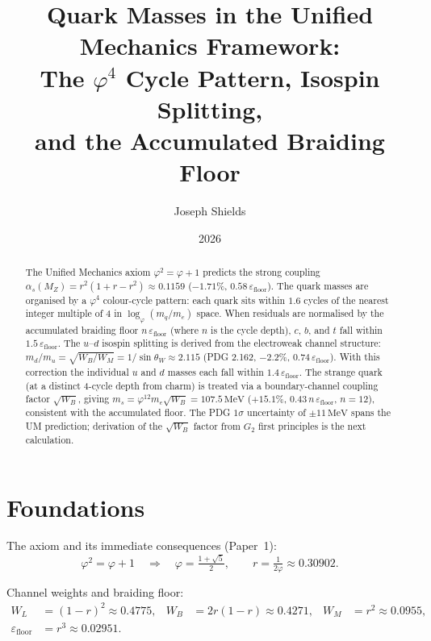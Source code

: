\documentclass[12pt]{article}
\title{\textbf{Quark Masses in the Unified Mechanics Framework:\\
The $\varphi^4$ Cycle Pattern, Isospin Splitting,\\
and the Accumulated Braiding Floor}}
\author{Joseph Shields}
\date{2026}
\begin{document}
\maketitle

\begin{abstract}
The Unified Mechanics axiom $\varphi^2 = \varphi + 1$ predicts the strong coupling
$\alpha_s(M_Z) = r^2(1+r-r^2) \approx 0.1159$ ($-1.71\%$,
$0.58\,\varepsilon_{\text{floor}}$). The quark masses are organised by
a $\varphi^4$ colour-cycle pattern: each quark sits within $1.6$ cycles of
the nearest integer multiple of 4 in $\log_\varphi(m_q/m_e)$ space.
When residuals are normalised by the accumulated braiding floor
$n\,\varepsilon_{\text{floor}}$ (where $n$ is the cycle depth), $c$, $b$, and
$t$ fall within $1.5\,\varepsilon_{\text{floor}}$. The $u$--$d$ isospin
splitting is derived from the electroweak channel structure:
$m_d/m_u = \sqrt{W_B/W_M} = 1/\!\sin\theta_W \approx 2.115$ (PDG 2.162,
$-2.2\%$, $0.74\,\varepsilon_{\text{floor}}$). With this correction the
individual $u$ and $d$ masses each fall within $1.4\,\varepsilon_{\text{floor}}$.
The strange quark (at a distinct 4-cycle depth from charm) is treated via a
boundary-channel coupling factor $\sqrt{W_B}$, giving $m_s = \varphi^{12}m_e\sqrt{W_B}
= 107.5\,\text{MeV}$ ($+15.1\%$, $0.43\,n\,\varepsilon_{\text{floor}}$, $n = 12$),
consistent with the accumulated floor. The PDG $1\sigma$ uncertainty of
$\pm 11\,\text{MeV}$ spans the UM prediction; derivation of the $\sqrt{W_B}$
factor from $G_2$ first principles is the next calculation.
\end{abstract}

\section{Foundations}

The axiom and its immediate consequences (Paper~1):
\begin{equation}
  \varphi^2 = \varphi + 1
  \quad\Rightarrow\quad
  \varphi = \tfrac{1+\sqrt{5}}{2},\qquad
  r = \tfrac{1}{2\varphi} \approx 0.30902.
  \label{eq:axiom}
\end{equation}

Channel weights and braiding floor:
\begin{align}
  W_L &= (1-r)^2 \approx 0.4775, &
  W_B &= 2r(1-r) \approx 0.4271, &
  W_M &= r^2 \approx 0.0955, \\
  \varepsilon_{\text{floor}} &= r^3 \approx 0.02951.
\end{align}
\end{document}
